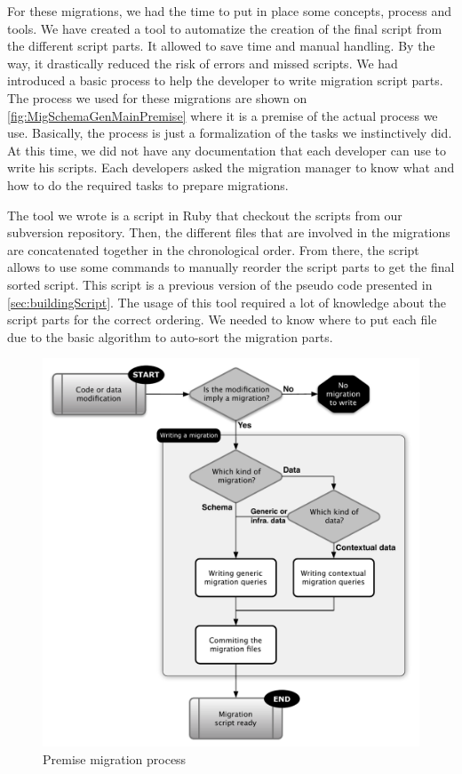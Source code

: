 For these migrations, we had the time to put in place some concepts, process and tools. We have created a tool to automatize the creation of the final script from the different script parts. It allowed to save time and manual handling. By the way, it drastically reduced the risk of errors and missed scripts. We had introduced a basic process to help the developer to write migration script parts. The process we used for these migrations are shown on \autoref{fig:MigSchemaGenMainPremise} where it is a premise of the actual process we use. Basically, the process is just a formalization of the tasks we instinctively did. At this time, we did not have any documentation that each developer can use to write his scripts. Each developers asked the migration manager to know what and how to do the required tasks to prepare migrations.

The tool we wrote is a script in Ruby\cite{ruby} that checkout the scripts from our subversion repository. Then, the different files that are involved in the migrations are concatenated together in the chronological order. From there, the script allows to use some commands to manually reorder the script parts to get the final sorted script. This script is a previous version of the pseudo code presented in \autoref{sec:buildingScript}. The usage of this tool required a lot of knowledge about the script parts for the correct ordering. We needed to know where to put each file due to the basic algorithm to auto-sort the migration parts.

\begin{figure}[h]
        \centering
        \includegraphics[scale=0.50]{images/mig-schema-gen-main-premise.pdf}
        \caption{Premise migration process}
        \label{fig:MigSchemaGenMainPremise}
\end{figure}

